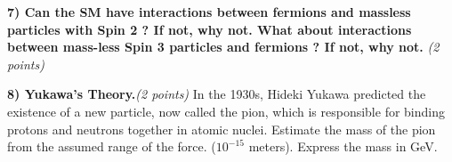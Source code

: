 {%
%

\textbf{7) Can the SM have interactions between fermions and massless particles with Spin 2 ? If not, why not.  What about interactions between mass-less Spin 3 particles and fermions ? If not, why not. }\hfill \textit{(2 points)}\\

\vspace*{1.5in}

\textbf{8) Yukawa’s Theory.}\hfill \textit{(2 points)}
In the 1930s, Hideki Yukawa predicted the existence of a new particle, now called the pion, which is responsible for binding protons and neutrons together in atomic nuclei. 
Estimate the mass of the pion from the assumed range of the force. ($10^{-15}$ meters). 
Express the mass in GeV.

\clearpage




}
